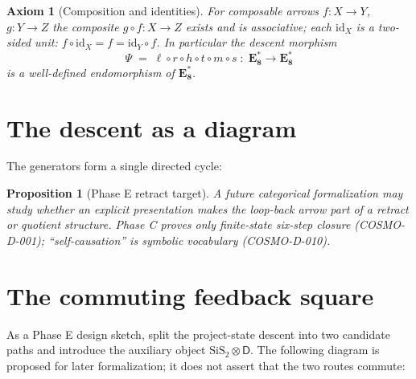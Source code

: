 \documentclass[11pt]{article}
\theoremstyle{definition}
\theoremstyle{plain}
\newtheorem{proposition}[definition]{Proposition}
\newtheorem{axiom}[definition]{Axiom}
\theoremstyle{remark}
\newcommand{\id}{\mathrm{id}}
\newcommand{\EEs}{\mathbf{E_8^{*}}}
\newcommand{\SiS}{\mathrm{SiS_2}}
\newcommand{\HPV}{\mathrm{HPV16}}
\newcommand{\phigr}{\varphi}
\newcommand{\DIAG}{\mathrm{DIAG}}
\begin{document}
\begin{axiom}[Composition and identities]
For composable arrows $f:X\to Y$, $g:Y\to Z$ the composite $g\circ f:X\to Z$
exists and is associative; each $\id_X$ is a two-sided unit:
$f\circ\id_X = f = \id_Y\circ f$. In particular the \emph{descent morphism}
\[
  \Psi \;=\; \ell\circ r\circ h\circ t\circ m\circ s \;:\; \EEs \to \EEs
\]
is a well-defined endomorphism of $\EEs$.
\end{axiom}

\section{The descent as a diagram}
The generators form a single directed cycle:

\begin{center}
\end{center}

\begin{proposition}[Phase E retract target]
A future categorical formalization may study whether an explicit presentation
makes the loop-back arrow part of a retract or quotient structure. Phase C
proves only finite-state six-step closure (COSMO-D-001); ``self-causation'' is
symbolic vocabulary (COSMO-D-010).
\end{proposition}

\section{The commuting feedback square}
As a Phase E design sketch, split the project-state descent into two candidate
paths and introduce the auxiliary object $\SiS\!\otimes\!\mathsf{D}$. The
following diagram is proposed for later formalization; it does not assert that
the two routes commute:

\begin{center}
\end{center}
\end{document}
